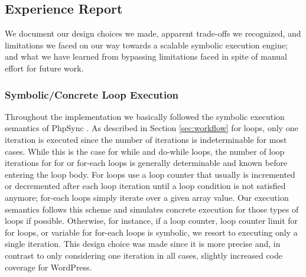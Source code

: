 \documentclass[sigconf]{acmart}
\renewcommand{\sf}[1]{\textsf{#1}}
\begin{document}
\subsection{Experience Report}\label{sec:experience_report}
We document our design choices we made, apparent trade-offs we
recognized, and limitations we faced on our way towards a scalable symbolic
execution engine; and what we have learned from bypassing limitations faced in
spite of manual effort for future work.

\subsubsection{Symbolic/Concrete Loop Execution}
Throughout the implementation we basically followed the symbolic execution
semantics of \sf{PhpSync} \cite{Nguyen:2014:BCG:2635868.2635928}. As described
in Section \ref{sec:workflow} for loops, only one iteration is executed since
the number of iterations is indeterminable for most cases. While this is the
case for while and do-while loops, the number of loop iterations for for or
for-each loops is generally determinable and known before entering the loop
body. For loops use a loop counter that usually is incremented or decremented
after each loop iteration until a loop condition is not satisfied anymore;
for-each loops simply iterate over a given array value.
Our execution semantics follows this scheme and simulates concrete execution
for those types of loops if possible. Otherwise, for instance, if a loop
counter, loop counter limit for for loops, or variable for for-each loops is
symbolic, we resort to executing only a single iteration. This design choice
was made since it is more precise and, in contrast to only considering one
iteration in all cases, slightly increased code coverage for \sf{WordPress}.
\end{document}
